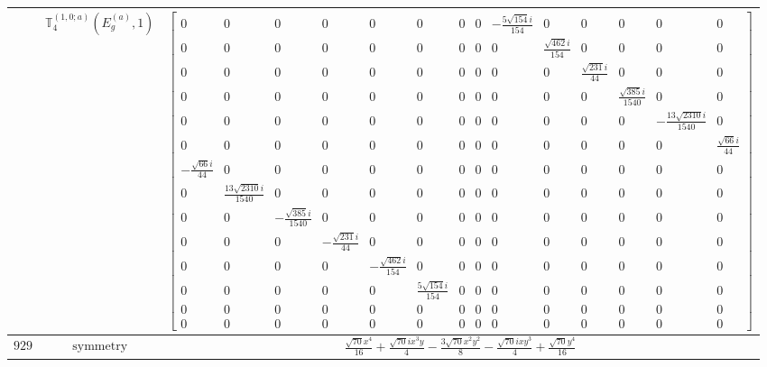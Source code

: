 \documentclass[fleqn,8pt,landscape]{jsarticle}
\begin{document}
\begin{longtable}{ccc}
$  $ & $ \mathbb{T}_{4}^{(1,0;a)}(E_{g}^{(a)},1) $ & $ \begin{bmatrix} 0 & 0 & 0 & 0 & 0 & 0 & 0 & 0 & - \frac{5 \sqrt{154} i}{154} & 0 & 0 & 0 & 0 & 0 \\ 0 & 0 & 0 & 0 & 0 & 0 & 0 & 0 & 0 & \frac{\sqrt{462} i}{154} & 0 & 0 & 0 & 0 \\ 0 & 0 & 0 & 0 & 0 & 0 & 0 & 0 & 0 & 0 & \frac{\sqrt{231} i}{44} & 0 & 0 & 0 \\ 0 & 0 & 0 & 0 & 0 & 0 & 0 & 0 & 0 & 0 & 0 & \frac{\sqrt{385} i}{1540} & 0 & 0 \\ 0 & 0 & 0 & 0 & 0 & 0 & 0 & 0 & 0 & 0 & 0 & 0 & - \frac{13 \sqrt{2310} i}{1540} & 0 \\ 0 & 0 & 0 & 0 & 0 & 0 & 0 & 0 & 0 & 0 & 0 & 0 & 0 & \frac{\sqrt{66} i}{44} \\ - \frac{\sqrt{66} i}{44} & 0 & 0 & 0 & 0 & 0 & 0 & 0 & 0 & 0 & 0 & 0 & 0 & 0 \\ 0 & \frac{13 \sqrt{2310} i}{1540} & 0 & 0 & 0 & 0 & 0 & 0 & 0 & 0 & 0 & 0 & 0 & 0 \\ 0 & 0 & - \frac{\sqrt{385} i}{1540} & 0 & 0 & 0 & 0 & 0 & 0 & 0 & 0 & 0 & 0 & 0 \\ 0 & 0 & 0 & - \frac{\sqrt{231} i}{44} & 0 & 0 & 0 & 0 & 0 & 0 & 0 & 0 & 0 & 0 \\ 0 & 0 & 0 & 0 & - \frac{\sqrt{462} i}{154} & 0 & 0 & 0 & 0 & 0 & 0 & 0 & 0 & 0 \\ 0 & 0 & 0 & 0 & 0 & \frac{5 \sqrt{154} i}{154} & 0 & 0 & 0 & 0 & 0 & 0 & 0 & 0 \\ 0 & 0 & 0 & 0 & 0 & 0 & 0 & 0 & 0 & 0 & 0 & 0 & 0 & 0 \\ 0 & 0 & 0 & 0 & 0 & 0 & 0 & 0 & 0 & 0 & 0 & 0 & 0 & 0 \end{bmatrix} $ \\ \hline
$ 929 $ & $ \text{symmetry} $ & $ \frac{\sqrt{70} x^{4}}{16} + \frac{\sqrt{70} i x^{3} y}{4} - \frac{3 \sqrt{70} x^{2} y^{2}}{8} - \frac{\sqrt{70} i x y^{3}}{4} + \frac{\sqrt{70} y^{4}}{16} $ \\

\end{longtable}
\end{document}
